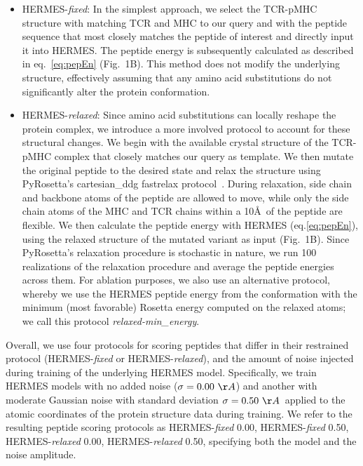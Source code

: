 \begin{itemize}
\item HERMES-{\em fixed}: In the simplest approach, we select the TCR-pMHC structure with matching
TCR and MHC to our query and with the peptide sequence that most closely matches the peptide of
interest and directly input it into HERMES. The peptide energy is subsequently calculated as
described in eq.~\ref{eq:pepEn} (Fig.~1B). This method does not modify the underlying structure,
effectively assuming that any amino acid substitutions do not significantly alter the protein
conformation.

\item HERMES-{\em relaxed}: Since amino acid substitutions can locally reshape the protein complex,
we introduce a more involved protocol to account for these structural changes. We begin with the
available crystal structure of the TCR-pMHC complex that closely matches our query as template. We
then mutate the original peptide to the desired state and relax the structure using PyRosetta's
cartesian\_ddg fastrelax protocol~\cite{Chaudhury2010-mo}. During relaxation, side chain and
backbone atoms of the peptide are allowed to move, while only the side chain atoms of the MHC and
TCR chains within a 10\AA\, of the peptide are flexible. We then calculate the peptide energy with
HERMES (eq.\ref{eq:pepEn}), using the relaxed structure of the mutated variant as input (Fig.~1B).
Since PyRosetta's relaxation procedure is stochastic in nature, we run 100 realizations of the
relaxation procedure and average the peptide energies across them.
 For ablation purposes, we also use an alternative protocol, whereby we use the HERMES peptide
 energy from the conformation with the minimum (most favorable) Rosetta energy computed on the
 relaxed atoms; we call this protocol {\em relaxed-min\_energy}.
\end{itemize}

\noindent Overall, we use four protocols for scoring peptides that differ in their restrained
protocol (HERMES-{\em fixed} or HERMES-{\em relaxed}), and the amount of noise injected during
training of the underlying HERMES model. Specifically, we train HERMES models with no added noise
($\sigma =0.00~\AA$) and another with moderate Gaussian noise with standard deviation $\sigma=
0.50~\AA$~applied to the atomic coordinates of the protein structure data during training. We refer
to the resulting peptide scoring protocols as HERMES-{\em fixed} 0.00, HERMES-{\em fixed} 0.50,
HERMES-{\em relaxed} 0.00, HERMES-{\em relaxed} 0.50, specifying both the model and the noise
amplitude.




